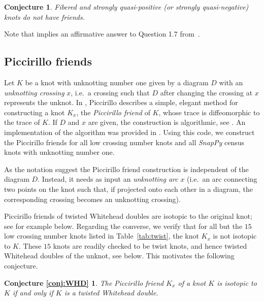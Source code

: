 \documentclass{amsart} %
\theoremstyle{thm}
\newtheorem{con}[Theorem]{Conjecture}
\newtheorem*{conj:WHD}{Conjecture \ref{conj:WHD}}
\theoremstyle{definition}
\numberwithin{equation}{section}
\begin{document}
\begin{con}\label{conj:fibSQP}
    Fibered and strongly quasi-positive (or strongly quasi-negative) knots do not have friends.
\end{con}

Note that  implies an affirmative answer to Question 1.7 from~\cite{Baldwin_sivek_traces}.

\subsection{Piccirillo friends}

Let $K$ be a knot with unknotting number one given by a diagram $D$ with an {\em unknotting crossing} $x$, i.e.\ a crossing such that $D$ after changing the crossing at $x$ represents the unknot. In \cite{Piccirillo_Conway_knot}, Piccirillo describes a simple, elegant method for constructing a knot $K_x$, the \emph{Piccirillo friend} of $K$, whose trace is diffeomorphic to the trace of $K$. If $D$ and $x$ are given, the construction is algorithmic, see . An implementation of the algorithm was provided in \cite{Kegel_Weiss}. Using this code, we construct the Piccirillo friends for all low crossing number knots and all {\em SnapPy} census knots with unknotting number one.

As the notation suggest the Piccirillo friend construction is independent of the diagram $D$. Instead, it needs as input an {\em unknotting arc} $x$ (i.e.\ an arc connecting two points on the knot such that, if projected onto each other in a diagram, the corresponding crossing becomes an unknotting crossing). 

Piccirillo friends of twisted Whitehead doubles are isotopic to the original knot; see for example  below. Regarding the converse, we verify that for all but the $15$ low crossing number knots listed in Table~\ref{tab:twist}, the knot $K_x$ is not isotopic to $K$. These $15$ knots are readily checked to be twist knots, and hence twisted Whitehead doubles of the unknot, see  below. This motivates the following conjecture.

\begin{conj:WHD}
The Piccirillo friend $K_x$ of a knot $K$ is isotopic to $K$ if and only if $K$ is a twisted Whitehead double.
\end{conj:WHD}
\end{document}
